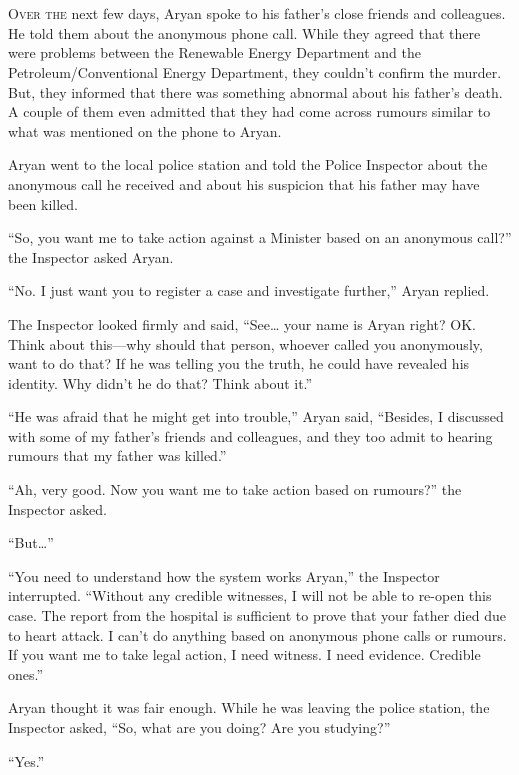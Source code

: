 \chapter{}

\lettrine{O}{ver the} next few days, Aryan spoke to his father's close friends and
colleagues. He told them about the anonymous phone call. While they agreed that
there were problems between the Renewable Energy Department and the
Petroleum/Conventional Energy Department, they couldn't confirm the murder. But,
they informed that there was something abnormal about his father's death. A
couple of them even admitted that they had come across rumours similar to what
was mentioned on the phone to Aryan.

Aryan went to the local police station and told the Police Inspector about the
anonymous call he received and about his suspicion that his father may have been
killed.

“So, you want me to take action against a Minister based on an anonymous call?”
the Inspector asked Aryan.

“No. I just want you to register a case and investigate further,” Aryan replied.

The Inspector looked firmly and said, “See… your name is Aryan right? OK.
Think about this—why should that person, whoever called you anonymously, want
to do that? If he was telling you the truth, he could have revealed his
identity. Why didn't he do that? Think about it.”

“He was afraid that he might get into trouble,” Aryan said, “Besides, I
discussed with some of my father's friends and colleagues, and they too admit to
hearing rumours that my father was killed.”

“Ah, very good. Now you want me to take action based on rumours?” the Inspector
asked.

“But…”

“You need to understand how the system works Aryan,” the Inspector interrupted.
“Without any credible witnesses, I will not be able to re-open this case. The
report from the hospital is sufficient to prove that your father died due to
heart attack. I can't do anything based on anonymous phone calls or rumours. If
you want me to take legal action, I need witness. I need evidence. Credible
ones.”

Aryan thought it was fair enough. While he was leaving the police station, the
Inspector asked, “So, what are you doing? Are you studying?”

“Yes.”


